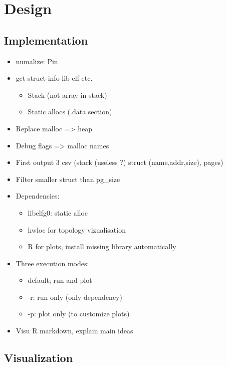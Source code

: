 
\section{Design}
\label{sec:design}
\subsection{Implementation}
\label{sec:design-impl}
\begin{itemize}
    \item numalize: Pin \cite{Luk05Pin}
    \item get struct info lib elf etc.
        \begin{itemize}
            \item Stack (not array in stack)
            \item Static allocs (.data section)
        \end{itemize}
    \item Replace malloc => heap
    \item Debug flags => malloc names
    \item First output 3 csv (stack (useless ?) struct (name,addr,size),
        pages)
    \item Filter smaller struct than pg\_size
    \item Dependencies:
        \begin{itemize}
            \item libelfg0: static alloc
            \item hwloc for topology vizualisation
            \item R for plots, install missing library automatically
        \end{itemize}
    \item Three execution modes:
        \begin{itemize}
            \item default; run and plot
            \item -r: run only (only dependency)
            \item -p: plot only (to customize plots)
        \end{itemize}
    \item Visu R markdown, explain main ideas
\end{itemize}
\subsection{Visualization}
\label{sec:design-visu}

